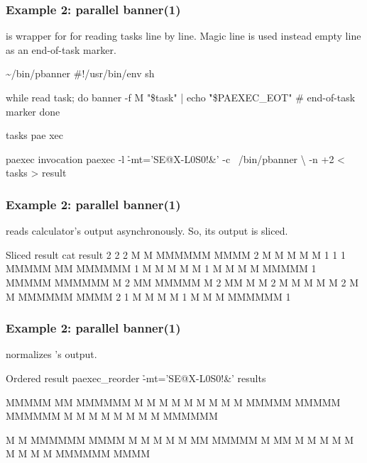 \documentclass[hyperref={colorlinks=true}]{beamer}
\begin{document}
\begin{frame}[fragile]
  \frametitle{Example 2: parallel banner(1)}
 is wrapper for  for reading tasks line by line.
Magic line is used instead empty line as an end-of-task marker.
  \begin{block}{}
      \begin{Code}{\~{}/bin/pbanner}
#!/usr/bin/env sh

while read task; do
   banner -f M "\$task" |
   echo \h{"\$PAEXEC\_EOT"} # end-of-task marker
done
      \end{Code}
      \begin{Code}{tasks}
pae
xec
      \end{Code}

      \begin{Code}{paexec invocation}
\prompt{\$} paexec -l \h{-mt='SE@X-L0S0!&'} -c ~/bin/pbanner \textbackslash
   -n +2 < tasks > result
\prompt{\$}
      \end{Code}
  \end{block}
\end{frame}

\linespread{0.5}
\begin{frame}[fragile]
  \frametitle{Example 2: parallel banner(1)}
 reads calculator's output asynchronously.
So, its output is sliced.
  \begin{block}{}
      \begin{CodeSmall}{Sliced result}
\prompt{\$} cat result
2 
2 
2  M    M  MMMMMM   MMMM
2   M  M   M       M    M
1 
1 
1  MMMMM     MM    MMMMMM
1  M    M   M  M   M
1  M    M  M    M  MMMMM
1  MMMMM   MMMMMM  M
2    MM    MMMMM   M
2    MM    M       M
2   M  M   M       M    M
2  M    M  MMMMMM   MMMM
2 
1  M       M    M  M
1  M       M    M  MMMMMM
1 
\prompt{\$}
      \end{CodeSmall}
  \end{block}
\end{frame}
\linespread{1}

\linespread{0.5}
\begin{frame}[fragile]
  \frametitle{Example 2: parallel banner(1)}
 normalizes 's output.
  \begin{block}{}
      \begin{CodeSmall}{Ordered result}
\prompt{\$} paexec_reorder \h{-mt='SE@X-L0S0!&'} results


MMMMM     MM    MMMMMM
M    M   M  M   M
M    M  M    M  MMMMM
MMMMM   MMMMMM  M
M       M    M  M
M       M    M  MMMMMM



M    M  MMMMMM   MMMM
 M  M   M       M    M
  MM    MMMMM   M
  MM    M       M
 M  M   M       M    M
M    M  MMMMMM   MMMM


\prompt{\$}
      \end{CodeSmall}
  \end{block}
\end{frame}
\linespread{1}
\end{document}
